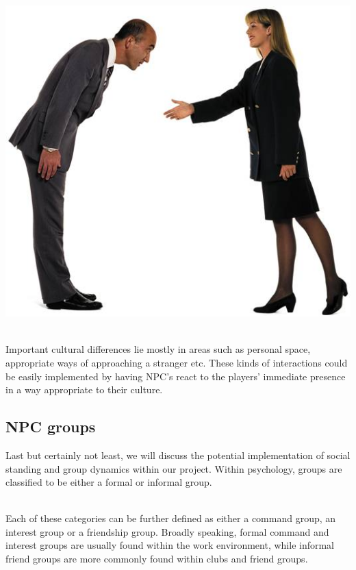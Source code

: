 \documentclass[11pt]{article} %
\begin{document}
~\\
\includegraphics[scale=0.7]{Culture}

~\\
Important cultural differences lie mostly in areas such as personal space, appropriate ways of approaching a stranger etc. These kinds of interactions could be easily implemented by having NPC's react to the players' immediate presence in a way appropriate to their culture.


\newpage
\subsection{NPC groups}
Last but certainly not least, we will discuss the potential implementation of social standing and group dynamics within our project. Within psychology, groups are classified to be either a formal or informal group. 

~\\
Each of these categories can be further defined as either a command group, an interest group or a friendship group. Broadly speaking, formal command and interest groups are usually found within the work environment, while informal friend groups are more commonly found within clubs and friend groups. 
\end{document}
